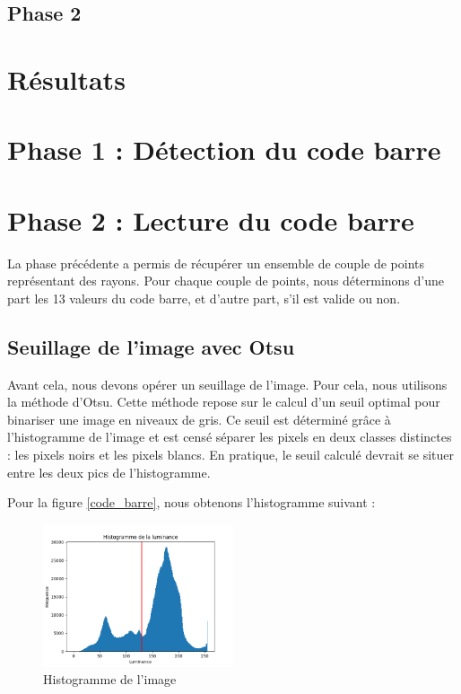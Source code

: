 \documentclass{rapport}
\begin{document}
\subsection{Phase 2}

\section{Résultats}

\section {Phase 1 : Détection du code barre}

\section{Phase 2 : Lecture du code barre}

La phase précédente a permis de récupérer un ensemble de couple de points représentant des rayons. 
Pour chaque couple de points, nous déterminons d'une part les 13 valeurs du code barre, et d'autre part, s'il est valide ou non.

\subsection{Seuillage de l'image avec Otsu}

Avant cela, nous devons opérer un seuillage de l'image. Pour cela, nous utilisons la méthode d'Otsu.
Cette méthode repose sur le calcul d'un seuil optimal pour binariser une image en niveaux de gris.
Ce seuil est déterminé grâce à l'histogramme de l'image et est censé séparer les pixels en deux classes distinctes : les pixels noirs et les pixels blancs.
En pratique, le seuil calculé devrait se situer entre les deux pics de l'histogramme.

Pour la figure \ref{code_barre}, nous obtenons l'histogramme suivant :

\begin{figure}[H] 
	\centering
	\includegraphics[width=0.5\textwidth]{images/histogramme.png}
	\caption{Histogramme de l'image}
	\label{histogramme}
\end{figure}
\end{document}
